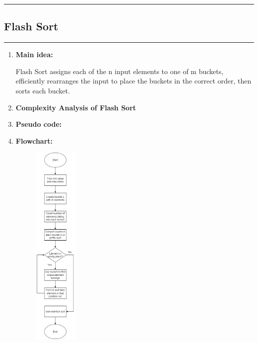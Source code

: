 \documentclass[11pt,a4paper]{article}
\begin{document}
{		\rule{15cm}{0.1cm}
		\subsection{Flash Sort}
		\rule{15cm}{0.1cm}
			\begin{enumerate}[label=\textbf{\arabic*})]
				\item \textbf{Main idea:}
				
					Flash Sort assigns each of the n input elements to one of m buckets, efficiently rearranges the input to place the buckets in the correct order, then sorts each bucket.
				\\[12pt]
				\item \textbf{Complexity Analysis of Flash Sort}
				
				\item \textbf{Pseudo code:} 
				\pagebreak
				\item \textbf{Flowchart:}
					\begin{figure}[H]
						\centering 
						\includegraphics[width=0.2\textwidth]{FlashSortFlowchart}
					\end{figure}
					

\end{enumerate}}
\end{document}
